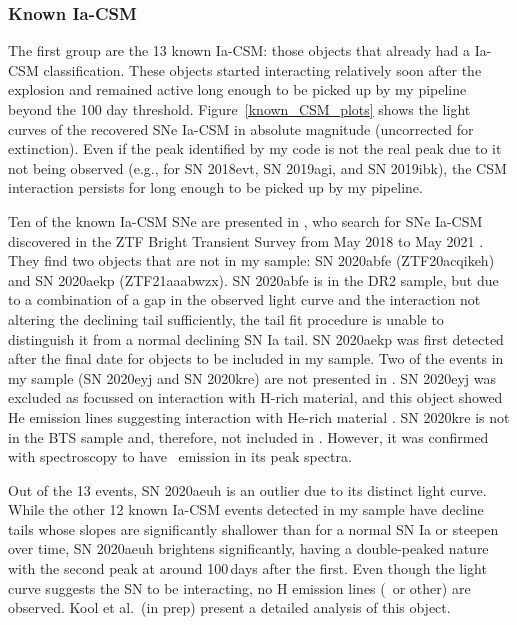 \documentclass[a4paper,oneside,12pt, class=Latex/Classes/PhDthesisPSnPDF, crop=false]{standalone}
\begin{document}
\subsubsection{Known Ia-CSM}
\label{known-iacsm}
The first group are the 13 known Ia-CSM: those objects that already had a Ia-CSM classification. These objects started interacting relatively soon after the explosion and remained active long enough to be picked up by my pipeline beyond the 100 day threshold. Figure~\ref{known_CSM_plots} shows the light curves of the recovered SNe Ia-CSM in absolute magnitude (uncorrected for extinction). Even if the peak identified by my code is not the real peak due to it not being observed (e.g., for SN 2018evt, SN 2019agi, and SN 2019ibk), the CSM interaction persists for long enough to be picked up by my pipeline.

Ten of the known Ia-CSM SNe are presented in \citet{Ia-CSM_BTS}, who search for SNe Ia-CSM discovered in the ZTF Bright Transient Survey from May 2018 to May 2021 \cite[BTS;][]{BTS_I, BTS_II}. They find two objects that are not in my sample: SN 2020abfe (ZTF20acqikeh) and SN 2020aekp (ZTF21aaabwzx). SN 2020abfe is in the DR2 sample, but due to a combination of a gap in the observed light curve and the interaction not altering the declining tail sufficiently, the tail fit procedure is unable to distinguish it from a normal declining SN Ia tail. SN 2020aekp was first detected after the final date for objects to be included in my sample. Two of the events in my sample (SN 2020eyj and SN 2020kre) are not presented in \citet{Ia-CSM_BTS}. SN 2020eyj was excluded as \citet{Ia-CSM_BTS} focussed on interaction with H-rich material, and this object showed He emission lines suggesting interaction with He-rich material \citep{Kool_He_CSM}. SN 2020kre is not in the BTS sample and, therefore, not included in \cite{Ia-CSM_BTS}. However, it was confirmed with spectroscopy to have \Halpha~emission in its peak spectra.

Out of the 13 events, SN 2020aeuh is an outlier due to its distinct light curve. While the other 12 known Ia-CSM events detected in my sample have decline tails whose slopes are significantly shallower than for a normal SN Ia or steepen over time, SN 2020aeuh brightens significantly, having a double-peaked nature with the second peak at around 100\,days after the first. Even though the light curve suggests the SN to be interacting, no H emission lines (\Halpha~or other) are observed. Kool et al.~(in prep) present a detailed analysis of this object.
\end{document}
